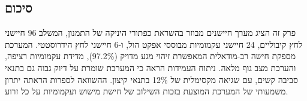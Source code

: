 \subsection{סיכום}
\label{sec:sensors_summary}

פרק זה הציג מערך חיישנים מבוזר בהשראת כפתורי היניקה של התמנון, המשלב 96 חיישני לחץ קיבוליים, 24 חיישני עקמומיות מבוססי אפקט הול, ו-6 חיישני לחץ הידרוסטטי. המערכת מספקת חישה רב-מודאלית המאפשרת זיהוי מגע מדויק (97.2\%), מדידת עקמומיות רציפה, והערכת מצב גוף מלאה. ניתוח העמידות הראה כי המערכת שומרת על דיוק גבוה גם בתנאי סביבה קשים, עם שגיאה מקסימלית של 12\% בתנאי קיצון. ההשוואה לספרות הראתה יתרון משמעותי של המערכת המוצעת בזכות השילוב של חישת מישוש ועקמומיות על כל זרוע.

\cite{Shih2020, Ozel2015, Renda2018, Rus2015, Laschi2016, Mazzolai2020}

